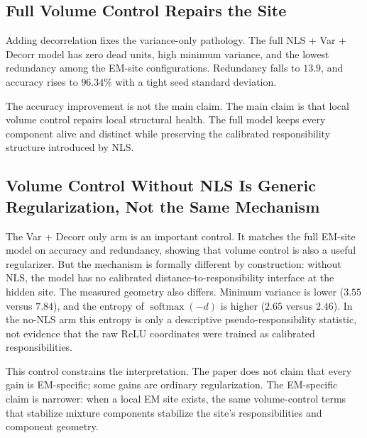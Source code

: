 \subsection{Full Volume Control Repairs the Site}
Adding decorrelation fixes the variance-only pathology. The full NLS + Var +
Decorr model has zero dead units, high minimum variance, and the lowest
redundancy among the EM-site configurations. Redundancy falls to $13.9$, and
accuracy rises to $96.34\%$ with a tight seed standard deviation.

The accuracy improvement is not the main claim. The main claim is that local
volume control repairs local structural health. The full model keeps every
component alive and distinct while preserving the calibrated responsibility
structure introduced by NLS.

\subsection{Volume Control Without NLS Is Generic Regularization, Not the Same
Mechanism}
The Var + Decorr only arm is an important control. It matches the full EM-site
model on accuracy and redundancy, showing that volume control is also a useful
regularizer. But the mechanism is formally different by construction: without
NLS, the model has no calibrated distance-to-responsibility interface at the
hidden site. The measured geometry also differs. Minimum variance is lower
($3.55$ versus $7.84$), and the entropy of $\operatorname{softmax}(-d)$ is
higher ($2.65$ versus $2.46$). In the no-NLS arm this entropy is only a
descriptive pseudo-responsibility statistic, not evidence that the raw ReLU
coordinates were trained as calibrated responsibilities.

This control constrains the interpretation. The paper does not claim that
every gain is EM-specific; some gains are ordinary regularization. The
EM-specific claim is narrower: when a local EM site exists, the same
volume-control terms that stabilize mixture components stabilize the site's
responsibilities and component geometry.


